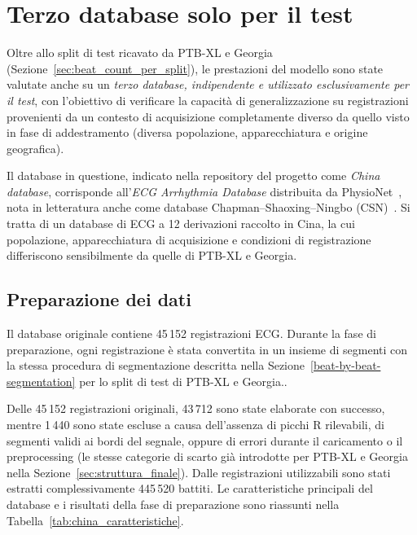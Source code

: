 \section{Terzo database solo per il test}
\label{china_dataset}

Oltre allo split di test ricavato da PTB-XL e Georgia (Sezione~\ref{sec:beat_count_per_split}), le prestazioni del modello sono state valutate anche su un \textit{terzo database, indipendente e utilizzato esclusivamente per il test}, con l'obiettivo di verificare la capacità di generalizzazione su registrazioni provenienti da un contesto di acquisizione completamente diverso da quello visto in fase di addestramento (diversa popolazione, apparecchiatura e origine geografica).

Il database in questione, indicato nella repository del progetto come \emph{China database}, corrisponde all'\emph{ECG Arrhythmia Database} distribuita da PhysioNet~\cite{zheng2022ecgarrhythmia}, nota in letteratura anche come database Chapman--Shaoxing--Ningbo (CSN)~\cite{zheng2020chapman}. Si tratta di un database di ECG a 12 derivazioni raccolto in Cina, la cui popolazione, apparecchiatura di acquisizione e condizioni di registrazione differiscono sensibilmente da quelle di PTB-XL e Georgia.

\subsection{Preparazione dei dati}

Il database originale contiene 45\,152 registrazioni ECG. Durante la fase di preparazione, ogni registrazione è stata convertita in un insieme di segmenti con la stessa procedura di segmentazione descritta nella Sezione~\ref{beat-by-beat-segmentation} per lo split di test di PTB-XL e Georgia..

Delle 45\,152 registrazioni originali, 43\,712 sono state elaborate con successo, mentre 1\,440 sono state escluse a causa dell'assenza di picchi R rilevabili, di segmenti validi ai bordi del segnale, oppure di errori durante il caricamento o il preprocessing (le stesse categorie di scarto già introdotte per PTB-XL e Georgia nella Sezione~\ref{sec:struttura_finale}). Dalle registrazioni utilizzabili sono stati estratti complessivamente 445\,520 battiti. Le caratteristiche principali del database e i risultati della fase di preparazione sono riassunti nella Tabella~\ref{tab:china_caratteristiche}.

